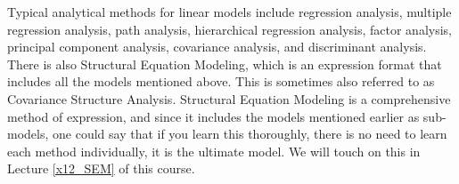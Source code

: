 \documentclass{ltjsbook}
\begin{document}
Typical analytical methods for linear models include regression analysis, multiple regression analysis, path analysis, hierarchical regression analysis, factor analysis, principal component analysis, covariance analysis, and discriminant analysis. There is also Structural Equation Modeling, which is an expression format that includes all the models mentioned above. This is sometimes also referred to as Covariance Structure Analysis. Structural Equation Modeling is a comprehensive method of expression, and since it includes the models mentioned earlier as sub-models, one could say that if you learn this thoroughly, there is no need to learn each method individually, it is the ultimate model. We will touch on this in Lecture \ref{x12_SEM} of this course.
\end{document}
